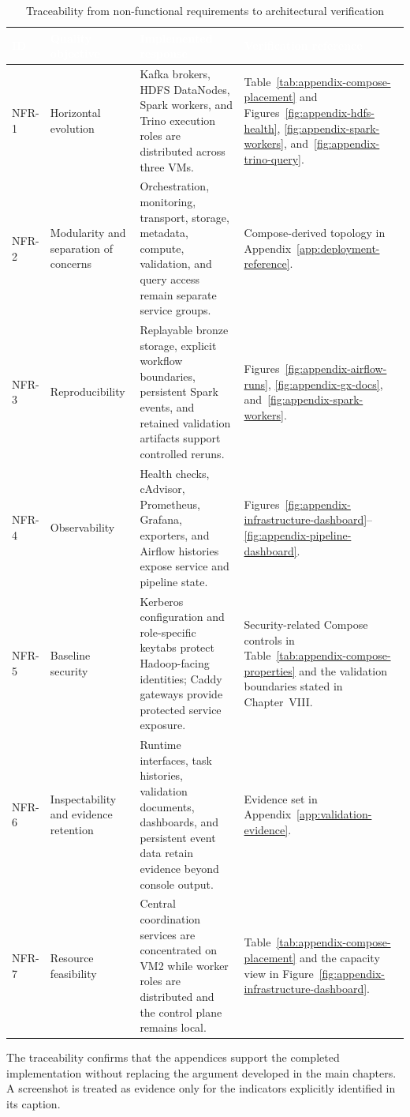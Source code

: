 \begin{table}[H]
    \centering
    \scriptsize
    \renewcommand{\arraystretch}{1.13}
    \begin{tabularx}{\textwidth}{|L{1.15cm}|L{3.9cm}|Y|L{3.4cm}|}
        \hline
        \textcolor{white}{\textbf{ID}} & \textcolor{white}{\textbf{Quality objective}} & \textcolor{white}{\textbf{Implemented response}} & \textcolor{white}{\textbf{Verification reference}} \\
        \hline
        NFR-1 & Horizontal evolution & Kafka brokers, HDFS DataNodes, Spark workers, and Trino execution roles are distributed across three VMs. & Table~\ref{tab:appendix-compose-placement} and Figures~\ref{fig:appendix-hdfs-health}, \ref{fig:appendix-spark-workers}, and~\ref{fig:appendix-trino-query}. \\
        \hline
        NFR-2 & Modularity and separation of concerns & Orchestration, monitoring, transport, storage, metadata, compute, validation, and query access remain separate service groups. & Compose-derived topology in Appendix~\ref{app:deployment-reference}. \\
        \hline
        NFR-3 & Reproducibility & Replayable bronze storage, explicit workflow boundaries, persistent Spark events, and retained validation artifacts support controlled reruns. & Figures~\ref{fig:appendix-airflow-runs}, \ref{fig:appendix-gx-docs}, and~\ref{fig:appendix-spark-workers}. \\
        \hline
        NFR-4 & Observability & Health checks, cAdvisor, Prometheus, Grafana, exporters, and Airflow histories expose service and pipeline state. & Figures~\ref{fig:appendix-infrastructure-dashboard}--\ref{fig:appendix-pipeline-dashboard}. \\
        \hline
        NFR-5 & Baseline security & Kerberos configuration and role-specific keytabs protect Hadoop-facing identities; Caddy gateways provide protected service exposure. & Security-related Compose controls in Table~\ref{tab:appendix-compose-properties} and the validation boundaries stated in Chapter~VIII. \\
        \hline
        NFR-6 & Inspectability and evidence retention & Runtime interfaces, task histories, validation documents, dashboards, and persistent event data retain evidence beyond console output. & Evidence set in Appendix~\ref{app:validation-evidence}. \\
        \hline
        NFR-7 & Resource feasibility & Central coordination services are concentrated on VM2 while worker roles are distributed and the control plane remains local. & Table~\ref{tab:appendix-compose-placement} and the capacity view in Figure~\ref{fig:appendix-infrastructure-dashboard}. \\
        \hline
    \end{tabularx}
    \caption{Traceability from non-functional requirements to architectural verification}
    \label{tab:appendix-nonfunctional-traceability}
\end{table}
\FloatBarrier

The traceability confirms that the appendices support the completed implementation without replacing the argument developed in the main chapters. A screenshot is treated as evidence only for the indicators explicitly identified in its caption.